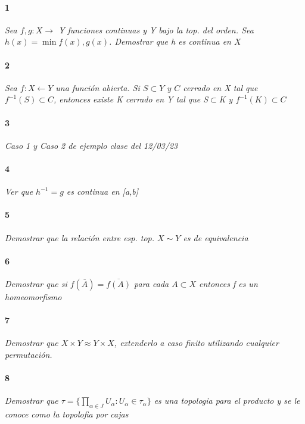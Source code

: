 \documentclass[12pt]{article}
\author{Alumnos: \\Arturo Rodriguez Contreras - 2132880 \\
Jonathan Raymundo Torres Cardenas - 1949731\\
Praxedis Jimenes Ruvalcaba \\
Erick Román Montemayor Treviño - 1957959 \\
Alexis Noe Mora Leyva \\
Everardo Flores Rivera - 2127301}
\begin{document}
\maketitle

\paragraph{1}
\textit{Sea $f,g:X\rightarrow$ Y funciones continuas y Y bajo la top. del orden. Sea $h(x)=\min{f(x),g(x)}$. Demostrar que h es continua en $X$}

\paragraph{2}
\textit{Sea $f:X\leftarrow Y$ una función abierta. Si $S \subset Y$ y $C$ cerrado en X tal que $f^{-1}(S)\subset C$, entonces existe K cerrado en Y tal que S$\subset$K y $f^{-1}(K)\subset C$}

\paragraph{3}
\textit{Caso 1 y Caso 2 de ejemplo clase del 12/03/23} 


\paragraph{4}
\textit{Ver que $h^{-1}=g$ es continua en [a,b]}

\paragraph{5}
\textit{Demostrar que la relación entre esp. top. $X\sim Y$ es de equivalencia}

\paragraph{6}
\textit{Demostrar que si $f(\overline{A})=\overline{f(A)}$ para cada $A\subset X$ entonces f es un homeomorfismo}

\paragraph{7}
\textit{Demostrar que $X\times Y \approx Y \times X$, extenderlo a caso finito utilizando cualquier permutación.}
 
\paragraph{8}
\textit{Demostrar que $\tau = \{\prod\limits_{\alpha\in J}U_\alpha : U_\alpha\in\tau_\alpha\}$ es una topologia para el producto y se le conoce como la topolofia por cajas}
\end{document}
